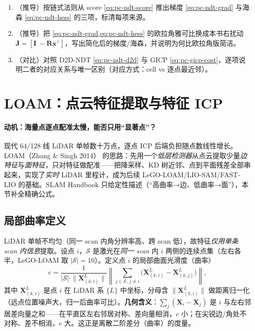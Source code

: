 \begin{practice}
\begin{enumerate}
  \item （推导）按链式法则从 score \cref{eq:pc-ndt-score} 推出梯度 \cref{eq:pc-ndt-grad} 与海森 \cref{eq:pc-ndt-hess} 的三项，标清每项来源。
  \item （推导）把 \cref{eq:pc-ndt-grad,eq:pc-ndt-hess} 的欧拉角雅可比换成本书右扰动 $\mathbf{J}=[\mathbf{I}\ {-}\mathbf{R}\mathbf{x}^\wedge]$，写出简化后的梯度/海森，并说明为何比欧拉角版简洁。
  \item （对比）对照 D2D-NDT \cref{eq:pc-ndt-d2d} 与 GICP \cref{eq:pc-gicp-cost}，逐项说明二者的对应关系与唯一区别（对应方式：cell vs 逐点最近邻）。
\end{enumerate}
\end{practice}

\section{LOAM：点云特征提取与特征 ICP}
\label{sec:pc-loam}

\paragraph{动机：海量点逐点配准太慢，能否只用“显著点”？}
现代 64/128 线 LiDAR 单帧数十万点，逐点 ICP 后端负担随点数线性增长。LOAM（Zhang \& Singh 2014）\cite{zhang2014loam} 的思路：先用一个\emph{低层检测器}从点云提取少量\emph{边特征}与\emph{面特征}，只对特征做配准——把降采样、KD 树近邻、点到平面残差全部串起来，实现了\emph{实时} LiDAR 里程计，成为后续 LeGO-LOAM/LIO-SAM/FAST-LIO 的基础。SLAM Handbook 只给定性描述（“高曲率→边、低曲率→面”），本节补全精确公式。

\subsection{局部曲率定义}
\label{sec:pc-loam-curv}

\begin{derivation}[局部曲面光滑度（曲率）]
LiDAR 单帧不均匀（同一 scan 内角分辨率高、跨 scan 低），故特征\emph{仅用单条 scan 内信息}提取。设点 $i$，$\mathcal{S}$ 是激光在\emph{同一 scan} 内 $i$ 两侧的连续点集（左右各半，LeGO-LOAM 取 $|\mathcal{S}|=10$）。定义点 $i$ 的局部曲面光滑度（曲率）
\begin{equation}
  c=\frac{1}{|\mathcal{S}|\cdot\|\mathbf{X}^L_{(k,i)}\|}\left\|\sum_{j\in\mathcal{S},\,j\neq i}\Big(\mathbf{X}^L_{(k,i)}-\mathbf{X}^L_{(k,j)}\Big)\right\|,
  \label{eq:pc-loam-curv}
\end{equation}
其中 $\mathbf{X}^L_{(k,i)}$ 是点 $i$ 在 LiDAR 系 $\{L\}$ 中坐标，分母含 $\|\mathbf{X}^L_{(k,i)}\|$ 做距离归一化（远点位置噪声大，归一后曲率可比）。\textbf{几何含义}：$\sum_j(\mathbf{X}_i-\mathbf{X}_j)$ 是 $i$ 与左右邻居差向量之和——在平直区左右邻居对称、差向量相消，$c$ 小；在尖锐边/角处不对称、差不相消，$c$ 大。这正是离散二阶差分（曲率）的度量。
\end{derivation}

